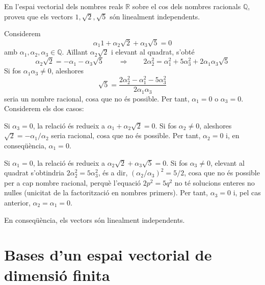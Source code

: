 \begin{exercici}
En l’espai vectorial dels nombres reals $\mathbb{R}$ sobre el
cos dels nombres racionals $\mathbb{Q}$, proveu que els vectors $%
1,\sqrt{2},\sqrt{5}$ són linealment independents.

\end{exercici}
\begin{solucio}
Considerem%
\begin{equation*}
\alpha _{1}1+\alpha _{2}\sqrt{2}+\alpha _{3}\sqrt{5}=0
\end{equation*}%
amb $\alpha _{1},\alpha _{2},\alpha _{3}\in \mathbb{Q}$. Aïllant $%
\alpha _{2}\sqrt{2}$ i elevant al quadrat, s'obté%
\begin{equation*}
\alpha _{2}\sqrt{2}=-\alpha _{1}-\alpha _{3}\sqrt{5}\qquad \Longrightarrow
\qquad 2\alpha _{2}^{2}=\alpha _{1}^{2}+5\alpha _{3}^{2}+2\alpha _{1}\alpha
_{3}\sqrt{5}
\end{equation*}%
Si fos $\alpha _{1}\alpha _{3}\neq 0$, aleshores%
\begin{equation*}
\sqrt{5}=\frac{2\alpha _{2}^{2}-\alpha _{1}^{2}-5\alpha _{3}^{2}}{2\alpha
_{1}\alpha _{3}}
\end{equation*}%
seria un nombre racional, cosa que no és possible. Per tant, $\alpha _{1}=0$
o $\alpha _{3}=0$. Considerem els dos casos:

Si $\alpha _{3}=0$, la relació és redueix a $\alpha _{1}+\alpha _{2}\sqrt{2}%
=0$. Si fos $\alpha _{2}\neq 0$, aleshores $\sqrt{2}=-\alpha _{1}/\alpha
_{2} $ seria racional, cosa que no és possible. Per tant, $\alpha _{2}=0$ i,
en conseqüència, $\alpha _{1}=0$.

Si $\alpha _{1}=0$, la relació és redueix a $\alpha _{2}\sqrt{2}+\alpha _{3}%
\sqrt{5}=0$. Si fos $\alpha _{3}\neq 0$, elevant al quadrat s'obtindria $%
2\alpha _{2}^{2}=5\alpha _{3}^{2}$, és a dir, $\left( \alpha _{2}/\alpha
_{3}\right) ^{2}=5/2$, cosa que no és possible per a cap nombre racional,
perquè l'equació $2p^{2}=5q^{2}$ no té solucions enteres no nul\textperiodcentered les
(unicitat de la factorització en nombres primers). Per tant, $\alpha _{3}=0$
i, pel cas anterior, $\alpha _{2}=\alpha _{1}=0$.

En conseqüència, els vectors són linealment independents.
\end{solucio}

\section{Bases d’un espai vectorial de dimensió finita}

